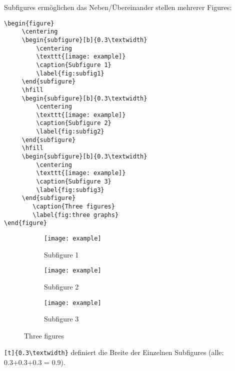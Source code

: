 \documentclass[twoside, 11pt, ngerman, a4paper, biblography=totoc]{scrartcl}
\begin{document}
Subfigures ermöglichen das Neben/Übereinander stellen mehrerer Figures:

\begin{lstlisting}[language=Tex]
\begin{figure}
     \centering
     \begin{subfigure}[b]{0.3\textwidth}
         \centering
         \texttt{[image: example]}
         \caption{Subfigure 1}
         \label{fig:subfig1}
     \end{subfigure}
     \hfill
     \begin{subfigure}[b]{0.3\textwidth}
         \centering
         \texttt{[image: example]}
         \caption{Subfigure 2}
         \label{fig:subfig2}
     \end{subfigure}
     \hfill
     \begin{subfigure}[b]{0.3\textwidth}
         \centering
         \texttt{[image: example]}
         \caption{Subfigure 3}
         \label{fig:subfig3}
     \end{subfigure}
        \caption{Three figures}
        \label{fig:three graphs}
\end{figure}
\end{lstlisting}

\begin{figure}[h!]
     \centering
     \begin{subfigure}[b]{0.3\textwidth}
         \centering
         \texttt{[image: example]}
         \caption{Subfigure 1}
         \label{fig:subfig1}
     \end{subfigure}
     \hfill
     \begin{subfigure}[b]{0.3\textwidth}
         \centering
         \texttt{[image: example]}
         \caption{Subfigure 2}
         \label{fig:subfig2}
     \end{subfigure}
     \hfill
     \begin{subfigure}[b]{0.3\textwidth}
         \centering
         \texttt{[image: example]}
         \caption{Subfigure 3}
         \label{fig:subfig3}
     \end{subfigure}
        \caption{Three figures}
        \label{fig:three graphs}
\end{figure}

\texttt{[t]\{0.3\textbackslash textwidth\}} definiert die Breite der Einzelnen Subfigures (alle: 0.3+0.3+0.3 = 0.9).
\end{document}
